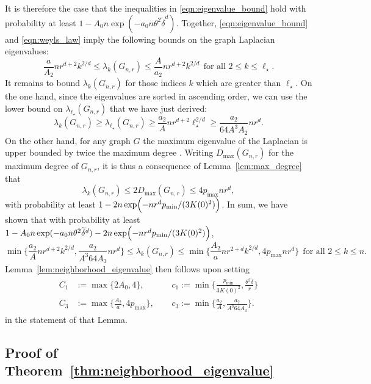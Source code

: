 \documentclass[twoside]{article}
\newcommand{\1}{\mathbf{1}}
\newcommand{\wt}[1]{\widetilde{#1}}
\theoremstyle{definition}
\theoremstyle{remark}
\begin{document}
It is therefore the case that the inequalities in \eqref{eqn:eigenvalue_bound} hold with probability at least $1 - A_0n\exp(-a_0n\theta^2\wt{\delta}^{d})$. Together, \eqref{eqn:eigenvalue_bound} and \eqref{eqn:weyls_law} imply the following bounds on the graph Laplacian eigenvalues:
\begin{equation*}
\frac{a}{A_2} nr^{d + 2} k^{2/d} \leq \lambda_k(G_{n,r}) \leq \frac{A}{a_2} nr^{d + 2} k^{2/d}~~\textrm{for all $2 \leq k \leq \ell_{\star}$}.
\end{equation*}
It remains to bound $\lambda_k(G_{n,r})$ for those indices $k$ which are greater than $\ell_{\star}$. On the one hand, since the eigenvalues are sorted in ascending order, we can use the lower bound on $\lambda_{\ell_{\star}}(G_{n,r})$ that we have just derived:
\begin{equation*}
\lambda_k(G_{n,r}) \geq \lambda_{\ell_{\star}}(G_{n,r}) \geq \frac{a_2}{A}nr^{d + 2}\ell_{\star}^{2/d} \geq \frac{a_2}{64A^3 A_2} nr^{d}.
\end{equation*}
On the other hand, for any graph $G$ the maximum eigenvalue of the Laplacian is upper bounded by twice the maximum degree \citep{chung97}. Writing $D_{\max}(G_{n,r})$ for the maximum degree of $G_{n,r}$, it is thus a consequence of Lemma~\ref{lem:max_degree} that
\begin{equation*}
\lambda_k(G_{n,r}) \leq 2D_{\max}(G_{n,r}) \leq 4p_{\max}nr^d,
\end{equation*}
with probability at least $1 - 2n\exp\Bigl(-nr^dp_{\min}/(3K(0)^2)\Bigr)$. In sum, we have shown that with probability at least $1 - A_0n\exp(-a_0n\theta^2\wt{\delta}^{d}) - 2n\exp\Bigl(-nr^dp_{\min}/(3K(0)^2)\Bigr)$,
\begin{equation*}
\min\biggl\{\frac{a_2}{A}nr^{d + 2}k^{2/d}, \frac{a_2}{A^3 64 A_3} nr^d\biggr\} \leq \lambda_k(G_{n,r}) \leq \min\biggl\{\frac{A_2}{a}nr^{2 + d}k^{2/d}, 4p_{\max}nr^d\biggr\}~~\textrm{for all $2 \leq k \leq n$.}
\end{equation*}
Lemma~\ref{lem:neighborhood_eigenvalue} then follows upon setting
\begin{align*}
C_1 & := \max\{2A_0,4\},~~ && c_1 := \min\Biggl\{\frac{p_{\min}}{3K(0)^2}, \frac{\theta^2\wt{\delta}}{r}\Biggr\} \\
C_3 & := \max\biggl\{\frac{A_2}{a}, 4p_{\max}\biggr\},~~ && c_3 := \min\biggl\{\frac{a_2}{A}, \frac{a_2}{A^3 64 A_3} \biggr\}.
\end{align*}
in the statement of that Lemma.

\subsection{Proof of Theorem~\ref{thm:neighborhood_eigenvalue}}
\label{subsec:neighbrhood_eigenvalue_pf}
\end{document}
